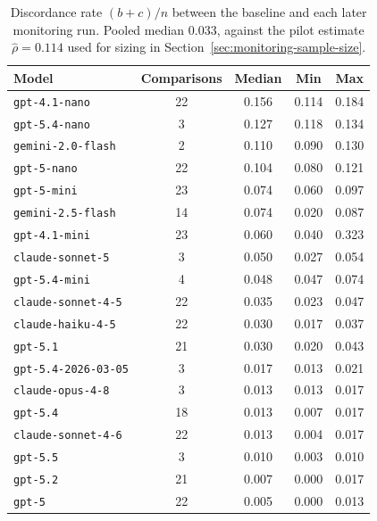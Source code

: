 \begin{table}[htbp]
    \centering
    \footnotesize
    \caption{Discordance rate $(b+c)/n$ between the baseline and each later
    monitoring run. Pooled median 0.033, against the
    pilot estimate $\hat\rho=0.114$ used for sizing in
    Section~\ref{sec:monitoring-sample-size}.}
    \label{tab:discordance}
    \begin{tabular}{lcccc}
    \toprule
    Model & Comparisons & Median & Min & Max \\
    \midrule
    \texttt{gpt-4.1-nano} & 22 & 0.156 & 0.114 & 0.184 \\
    \texttt{gpt-5.4-nano} & 3 & 0.127 & 0.118 & 0.134 \\
    \texttt{gemini-2.0-flash} & 2 & 0.110 & 0.090 & 0.130 \\
    \texttt{gpt-5-nano} & 22 & 0.104 & 0.080 & 0.121 \\
    \texttt{gpt-5-mini} & 23 & 0.074 & 0.060 & 0.097 \\
    \texttt{gemini-2.5-flash} & 14 & 0.074 & 0.020 & 0.087 \\
    \texttt{gpt-4.1-mini} & 23 & 0.060 & 0.040 & 0.323 \\
    \texttt{claude-sonnet-5} & 3 & 0.050 & 0.027 & 0.054 \\
    \texttt{gpt-5.4-mini} & 4 & 0.048 & 0.047 & 0.074 \\
    \texttt{claude-sonnet-4-5} & 22 & 0.035 & 0.023 & 0.047 \\
    \texttt{claude-haiku-4-5} & 22 & 0.030 & 0.017 & 0.037 \\
    \texttt{gpt-5.1} & 21 & 0.030 & 0.020 & 0.043 \\
    \texttt{gpt-5.4-2026-03-05} & 3 & 0.017 & 0.013 & 0.021 \\
    \texttt{claude-opus-4-8} & 3 & 0.013 & 0.013 & 0.017 \\
    \texttt{gpt-5.4} & 18 & 0.013 & 0.007 & 0.017 \\
    \texttt{claude-sonnet-4-6} & 22 & 0.013 & 0.004 & 0.017 \\
    \texttt{gpt-5.5} & 3 & 0.010 & 0.003 & 0.010 \\
    \texttt{gpt-5.2} & 21 & 0.007 & 0.000 & 0.017 \\
    \texttt{gpt-5} & 22 & 0.005 & 0.000 & 0.013 \\
    \bottomrule
    \end{tabular}
\end{table}
